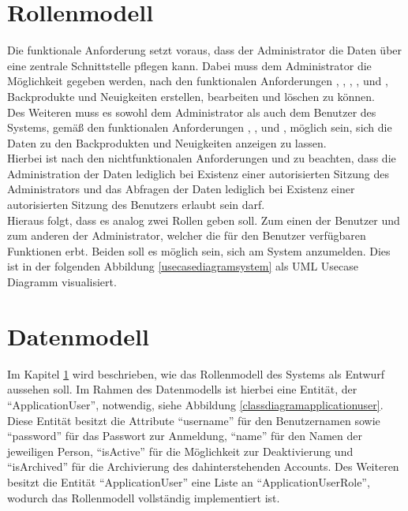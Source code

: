 \clearpage

\section{Rollenmodell} \label{rollenmodell}
Die funktionale Anforderung  setzt voraus, dass der Administrator die Daten über eine zentrale Schnittstelle pflegen kann. Dabei muss dem Administrator die Möglichkeit gegeben werden, nach den funktionalen Anforderungen , , , ,  und , Backprodukte und Neuigkeiten erstellen, bearbeiten und löschen zu können.
\\
Des Weiteren muss es sowohl dem Administrator als auch dem Benutzer des Systems, gemäß den funktionalen Anforderungen , ,  und , möglich sein, sich die Daten zu den Backprodukten und Neuigkeiten anzeigen zu lassen.
\\
Hierbei ist nach den nichtfunktionalen Anforderungen  und  zu beachten, dass die Administration der Daten lediglich bei Existenz einer autorisierten Sitzung des Administrators und das Abfragen der Daten lediglich bei Existenz einer autorisierten Sitzung des Benutzers erlaubt sein darf.
\\
Hieraus folgt, dass es analog zwei Rollen geben soll. Zum einen der Benutzer und zum anderen der Administrator, welcher die für den Benutzer verfügbaren Funktionen erbt. Beiden soll es möglich sein, sich am System anzumelden.
Dies ist in der folgenden Abbildung \ref{usecasediagramsystem} als UML Usecase Diagramm visualisiert.


\clearpage

\section{Datenmodell} \label{datenmodell}
Im Kapitel \ref{rollenmodell} wird beschrieben, wie das Rollenmodell des Systems als Entwurf aussehen soll.
Im Rahmen des Datenmodells ist hierbei eine Entität, der \enquote{ApplicationUser}, notwendig, siehe Abbildung \ref{classdiagramapplicationuser}. Diese Entität besitzt die Attribute \enquote{username} für den Benutzernamen sowie \enquote{password} für das Passwort zur Anmeldung, \enquote{name} für den Namen der jeweiligen Person, \enquote{isActive} für die Möglichkeit zur Deaktivierung und \enquote{isArchived} für die Archivierung des dahinterstehenden Accounts. Des Weiteren besitzt die Entität \mbox{\enquote{ApplicationUser}} eine Liste an \enquote{ApplicationUserRole}, wodurch das Rollenmodell vollständig implementiert ist.

